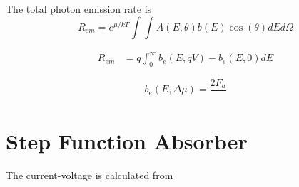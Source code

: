 \documentclass[12pt]{article}
\numberwithin{equation}{section}
\begin{document}


The total photon emission rate is 
\begin{equation}
R_{em} = e^{\mu/kT} \int \int A (E, \theta) b(E) \cos(\theta) dE d\Omega
\end{equation}

\begin{align}
R_{em} &= q \int_0 ^{\infty} b_e (E, qV) - b_e (E, 0) dE
\end{align}

\begin{equation}
b_e (E , \Delta \mu) = \frac{2 F_a}{}
\end{equation}



\section{Step Function Absorber}

The current-voltage is calculated from 






\end{document}
